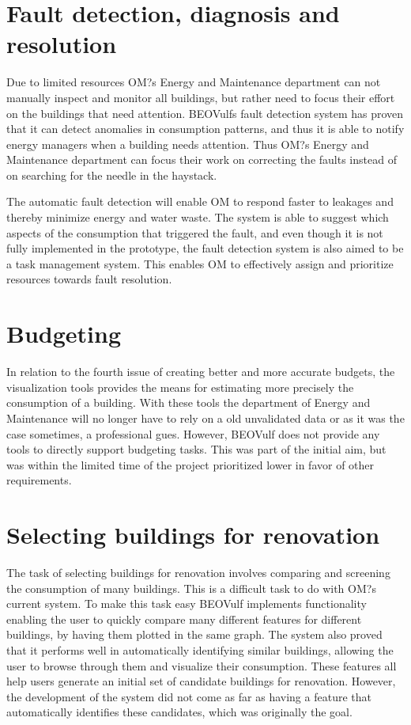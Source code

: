 \section{Fault detection, diagnosis and resolution}
Due to limited resources OM?s Energy and Maintenance department can not manually inspect and monitor all buildings, but rather need to focus their effort on the buildings that need attention. BEOVulfs fault detection system has proven that it can detect anomalies in consumption patterns, and thus it is able to notify energy managers when a building needs attention. Thus OM?s Energy and Maintenance department can focus their work on correcting the faults instead of on searching for the needle in the haystack.

The automatic fault detection will enable OM to respond faster to leakages and thereby minimize energy and water waste. The system is able to suggest which aspects of the consumption that triggered the fault, and even though it is not fully implemented in the prototype, the fault detection system is also aimed to be a task management system. This enables OM to effectively assign and prioritize resources towards fault resolution.
\section{Budgeting}
In relation to the fourth issue of creating better and more accurate budgets, the visualization tools provides the means for estimating more precisely the consumption of a building. With these tools the department of Energy and Maintenance will no longer have to rely on a old unvalidated data or as it was the case sometimes, a professional gues. However, BEOVulf does not provide any tools to directly support budgeting tasks. This was part of the initial aim, but was within the limited time of the project prioritized lower in favor of other requirements.
\section{Selecting buildings for renovation}
The task of selecting buildings for renovation involves comparing and screening the consumption of many buildings. This is a difficult task to do with OM?s current system. To make this task easy BEOVulf implements functionality enabling the user to quickly compare many different features for different buildings, by having them plotted in the same graph. The system also proved that it performs well in automatically identifying similar buildings, allowing the user to browse through them and visualize their consumption. These features all help users generate an initial set of candidate buildings for renovation. However, the development of the system did not come as far as having a feature that automatically identifies these candidates, which was originally the goal.

